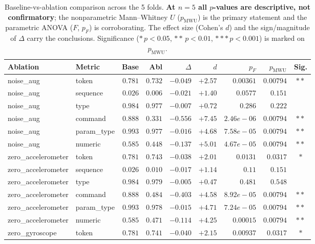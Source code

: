 \begin{table}[h]
\centering
\caption{Baseline-vs-ablation comparison across the 5 folds. \textbf{At $n=5$ all $p$-values are descriptive, not confirmatory}; the nonparametric Mann--Whitney $U$ ($p_{\mathrm{MWU}}$) is the primary statement and the parametric ANOVA ($F$, $p_F$) is corroborating. The effect size (Cohen's $d$) and the sign/magnitude of $\Delta$ carry the conclusions. Significance ($\ast\,p<0.05$, $\ast\ast\,p<0.01$, $\ast\ast\ast\,p<0.001$) is marked on $p_{\mathrm{MWU}}$.}
\label{tab:anova}
\scriptsize
\begin{tabular}{l l r r r r r r c}
\toprule
Ablation & Metric & Base & Abl & $\Delta$ & $d$ & $p_F$ & $p_{\mathrm{MWU}}$ & Sig. \\
\midrule
noise\_aug & token & $0.781$ & $0.732$ & $-0.049$ & $+2.57$ & $0.00361$ & $0.00794$ & $\ast\ast$ \\
noise\_aug & sequence & $0.026$ & $0.006$ & $-0.021$ & $+1.40$ & $0.0577$ & $0.151$ &  \\
noise\_aug & type & $0.984$ & $0.977$ & $-0.007$ & $+0.72$ & $0.286$ & $0.222$ &  \\
noise\_aug & command & $0.888$ & $0.331$ & $-0.556$ & $+7.45$ & $2.46e-06$ & $0.00794$ & $\ast\ast$ \\
noise\_aug & param\_type & $0.993$ & $0.977$ & $-0.016$ & $+4.68$ & $7.58e-05$ & $0.00794$ & $\ast\ast$ \\
noise\_aug & numeric & $0.585$ & $0.448$ & $-0.137$ & $+5.01$ & $4.67e-05$ & $0.00794$ & $\ast\ast$ \\
zero\_accelerometer & token & $0.781$ & $0.743$ & $-0.038$ & $+2.01$ & $0.0131$ & $0.0317$ & $\ast$ \\
zero\_accelerometer & sequence & $0.026$ & $0.010$ & $-0.017$ & $+1.14$ & $0.11$ & $0.151$ &  \\
zero\_accelerometer & type & $0.984$ & $0.979$ & $-0.005$ & $+0.47$ & $0.481$ & $0.548$ &  \\
zero\_accelerometer & command & $0.888$ & $0.484$ & $-0.403$ & $+4.58$ & $8.92e-05$ & $0.00794$ & $\ast\ast$ \\
zero\_accelerometer & param\_type & $0.993$ & $0.978$ & $-0.015$ & $+4.71$ & $7.24e-05$ & $0.00794$ & $\ast\ast$ \\
zero\_accelerometer & numeric & $0.585$ & $0.471$ & $-0.114$ & $+4.25$ & $0.00015$ & $0.00794$ & $\ast\ast$ \\
zero\_gyroscope & token & $0.781$ & $0.741$ & $-0.040$ & $+2.15$ & $0.00937$ & $0.0317$ & $\ast$ \\

\end{tabular}
\end{table}
